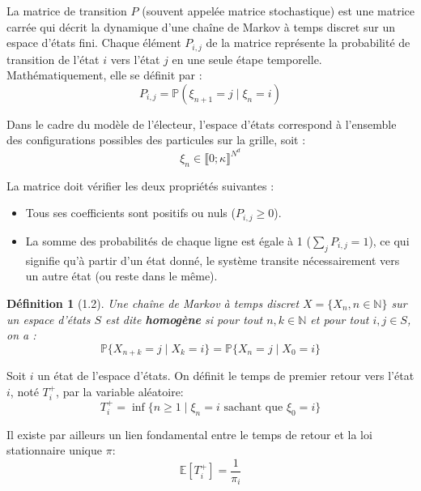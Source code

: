 \documentclass[11pt,a4paper]{article}
\newtheorem*{definition}{Définition}
\begin{document}
La matrice de transition $P$ (souvent appelée matrice stochastique)
est une matrice carrée qui décrit la dynamique d'une chaîne de Markov
à temps discret sur un espace d'états fini. Chaque élément $P_{i,j}$
de la matrice représente la probabilité de transition de l'état $i$
vers l'état $j$ en une seule étape temporelle. Mathématiquement, elle
se définit par :
\begin{equation}
P_{i,j} = \mathbb{P}(\xi_{n+1} = j \mid \xi_n = i)
\end{equation}

Dans le cadre du modèle de l'électeur, l'espace d'états correspond à l'ensemble des configurations possibles des particules sur la grille, soit :
\begin{equation}
\xi_n \in \llbracket 0;\kappa\rrbracket^{N^d}
\end{equation}

La matrice doit vérifier les deux propriétés suivantes :
\begin{itemize}
    \item Tous ses coefficients sont positifs ou nuls ($P_{i,j} \ge 0$).
    \item La somme des probabilités de chaque ligne est égale à 1 ($\sum_{j} P_{i,j} = 1$), ce qui signifie qu'à partir d'un état donné, le système transite nécessairement vers un autre état (ou reste dans le même).
\end{itemize}

\begin{definition}[1.2]
    Une chaîne de Markov à temps discret $X = \{X_n, n \in \mathbb{N}\}$ sur un espace d'états $S$ est dite \textbf{homogène} si pour tout $n, k \in \mathbb{N}$ et pour tout $i, j \in S$, on a :
    \begin{equation*}
        \mathbb{P}\{X_{n+k} = j \mid X_k = i\} = \mathbb{P}\{X_n = j \mid X_0 = i\}
    \end{equation*}
\end{definition}

Soit $i$ un état de l'espace d'états. On définit le temps de premier retour vers l'état $i$, noté $T_i^+$, par la variable aléatoire:
\begin{equation}
T_i^+ = \inf \{ n \ge 1 \mid \xi_n = i \text{ sachant que } \xi_0 = i \}
\end{equation}


Il existe par ailleurs un lien fondamental entre le temps de retour et la loi stationnaire unique $\pi$:
\begin{equation}
\mathbb{E}[T_i^+] = \frac{1}{\pi_i}
\end{equation}
\end{document}
